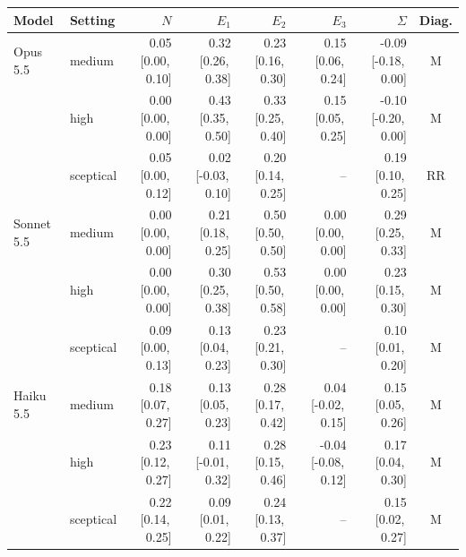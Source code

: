 \begin{tabular}{@{}llrrrrrc@{}}
\toprule
Model & Setting & $N$ & $E_1$ & $E_2$ & $E_3$ & $\Sigma$ & Diag. \\
\midrule
Opus 5.5 & medium & 0.05 {\scriptsize[0.00,\,0.10]} & 0.32 {\scriptsize[0.26,\,0.38]} & 0.23 {\scriptsize[0.16,\,0.30]} & 0.15 {\scriptsize[0.06,\,0.24]} & -0.09 {\scriptsize[-0.18,\,0.00]} & M \\
 & high & 0.00 {\scriptsize[0.00,\,0.00]} & 0.43 {\scriptsize[0.35,\,0.50]} & 0.33 {\scriptsize[0.25,\,0.40]} & 0.15 {\scriptsize[0.05,\,0.25]} & -0.10 {\scriptsize[-0.20,\,0.00]} & M \\
 & sceptical & 0.05 {\scriptsize[0.00,\,0.12]} & 0.02 {\scriptsize[-0.03,\,0.10]} & 0.20 {\scriptsize[0.14,\,0.25]} & -- & 0.19 {\scriptsize[0.10,\,0.25]} & RR \\
Sonnet 5.5 & medium & 0.00 {\scriptsize[0.00,\,0.00]} & 0.21 {\scriptsize[0.18,\,0.25]} & 0.50 {\scriptsize[0.50,\,0.50]} & 0.00 {\scriptsize[0.00,\,0.00]} & 0.29 {\scriptsize[0.25,\,0.33]} & M \\
 & high & 0.00 {\scriptsize[0.00,\,0.00]} & 0.30 {\scriptsize[0.25,\,0.38]} & 0.53 {\scriptsize[0.50,\,0.58]} & 0.00 {\scriptsize[0.00,\,0.00]} & 0.23 {\scriptsize[0.15,\,0.30]} & M \\
 & sceptical & 0.09 {\scriptsize[0.00,\,0.13]} & 0.13 {\scriptsize[0.04,\,0.23]} & 0.23 {\scriptsize[0.21,\,0.30]} & -- & 0.10 {\scriptsize[0.01,\,0.20]} & M \\
Haiku 5.5 & medium & 0.18 {\scriptsize[0.07,\,0.27]} & 0.13 {\scriptsize[0.05,\,0.23]} & 0.28 {\scriptsize[0.17,\,0.42]} & 0.04 {\scriptsize[-0.02,\,0.15]} & 0.15 {\scriptsize[0.05,\,0.26]} & M \\
 & high & 0.23 {\scriptsize[0.12,\,0.27]} & 0.11 {\scriptsize[-0.01,\,0.32]} & 0.28 {\scriptsize[0.15,\,0.46]} & -0.04 {\scriptsize[-0.08,\,0.12]} & 0.17 {\scriptsize[0.04,\,0.30]} & M \\
 & sceptical & 0.22 {\scriptsize[0.14,\,0.25]} & 0.09 {\scriptsize[0.01,\,0.22]} & 0.24 {\scriptsize[0.13,\,0.37]} & -- & 0.15 {\scriptsize[0.02,\,0.27]} & M \\
\bottomrule
\end{tabular}
